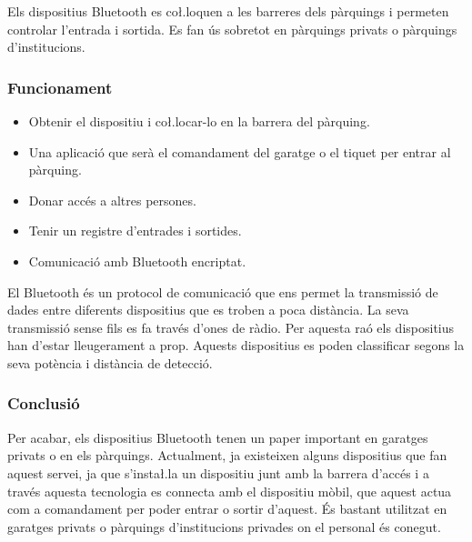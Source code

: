 Els dispositius Bluetooth es co\l.loquen a les barreres dels pàrquings i
permeten controlar l'entrada i sortida. Es fan ús sobretot en pàrquings
privats o pàrquings d'institucions.

\subsubsection{Funcionament}
\label{sssec:alternatives}

\begin{itemize}
    \item Obtenir el dispositiu i co\l.locar-lo en la barrera del pàrquing.
    \item Una aplicació que serà el comandament del garatge o el tiquet per entrar al pàrquing.
    \item Donar accés a altres persones.
    \item Tenir un registre d'entrades i sortides.
    \item Comunicació amb Bluetooth encriptat.
\end{itemize}


El Bluetooth és un protocol de comunicació que ens permet la transmissió
de dades entre diferents dispositius que es troben a poca distància. La seva transmissió
sense fils es fa través d'ones de ràdio. Per aquesta raó els dispositius han d'estar
lleugerament a prop. Aquests dispositius es poden classificar segons la seva potència i
distància de detecció.

\subsubsection{Conclusió}

Per acabar, els dispositius Bluetooth tenen un paper important en garatges privats o en els pàrquings. Actualment, ja existeixen alguns dispositius
que fan aquest servei, ja que s'insta\l.la un dispositiu junt amb la barrera d'accés i a través aquesta
tecnologia es connecta amb el dispositiu mòbil, que aquest actua com a comandament per poder entrar o sortir
d'aquest. És bastant utilitzat en garatges privats o pàrquings d'institucions privades on el personal és conegut.